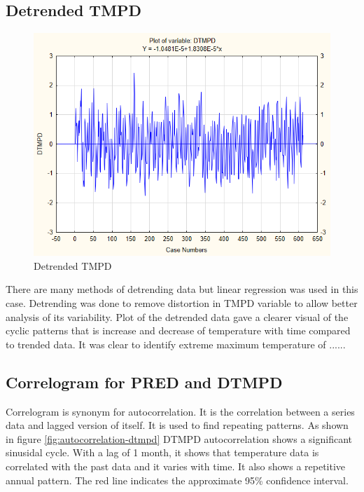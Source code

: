 \documentclass[12pt,a4paper]{article}
\begin{document}
\subsection{Detrended TMPD}
\begin{figure}[h]
	\centering
	\includegraphics[width=0.7\linewidth]{"../Assignment 2/Detrended TMPD"}
	\caption{Detrended TMPD}
	\label{fig:detrended-tmpd}
\end{figure}
\noindent There are many methods of detrending data but linear regression was used in this case. Detrending was done to remove distortion in TMPD variable to allow better analysis of its variability. Plot of the detrended data gave a clearer visual of the cyclic patterns that is increase and decrease of temperature with time compared to trended data. It was clear to identify extreme maximum temperature of ......

\subsection{Correlogram for PRED and DTMPD}
Correlogram is synonym for autocorrelation. It is the correlation between a series data and lagged version of itself. It is used to find repeating patterns. As shown in figure \ref{fig:autocorrelation-dtmpd} DTMPD autocorrelation shows a significant sinusidal cycle. With a lag of 1 month, it shows that temperature data is correlated with the past data and it varies with time. It also shows a repetitive annual pattern. The red line indicates the approximate 95\% confidence interval.\\
\end{document}

